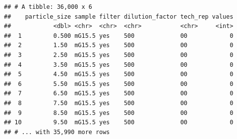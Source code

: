 \documentclass[10pt,letterpaper]{article}
\newenvironment{Shaded}{\begin{snugshade}}{\end{snugshade}}
\newcommand{\KeywordTok}[1]{\textcolor[rgb]{0.13,0.29,0.53}{\textbf{#1}}}
\newcommand{\DataTypeTok}[1]{\textcolor[rgb]{0.13,0.29,0.53}{#1}}
\newcommand{\DecValTok}[1]{\textcolor[rgb]{0.00,0.00,0.81}{#1}}
\newcommand{\StringTok}[1]{\textcolor[rgb]{0.31,0.60,0.02}{#1}}
\newcommand{\OperatorTok}[1]{\textcolor[rgb]{0.81,0.36,0.00}{\textbf{#1}}}
\newcommand{\NormalTok}[1]{#1}
\begin{document}
\begin{Shaded}
\end{Shaded}

\begin{verbatim}
## # A tibble: 36,000 x 6
##    particle_size sample filter dilution_factor tech_rep values
##            <dbl> <chr>  <chr>  <chr>           <chr>     <int>
##  1         0.500 mG15.5 yes    500             00            0
##  2         1.50  mG15.5 yes    500             00            0
##  3         2.50  mG15.5 yes    500             00            0
##  4         3.50  mG15.5 yes    500             00            0
##  5         4.50  mG15.5 yes    500             00            0
##  6         5.50  mG15.5 yes    500             00            0
##  7         6.50  mG15.5 yes    500             00            0
##  8         7.50  mG15.5 yes    500             00            0
##  9         8.50  mG15.5 yes    500             00            0
## 10         9.50  mG15.5 yes    500             00            0
## # ... with 35,990 more rows
\end{verbatim}

\begin{Shaded}
\end{Shaded}
\end{document}
